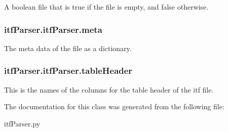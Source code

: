 A boolean file that is true if the file is empty, and false otherwise. 

\hypertarget{classitf_parser_1_1itf_parser_ac67cf5edcc9d174a9f212ae6a55a651c}{
\subsubsection[{meta}]{\setlength{\rightskip}{0pt plus 5cm}itf\-Parser.\-itf\-Parser.\-meta}}\label{classitf_parser_1_1itf_parser_ac67cf5edcc9d174a9f212ae6a55a651c}


The meta data of the file as a dictionary. 

\hypertarget{classitf_parser_1_1itf_parser_a3af398778ebdb14a94e1b0da2cc1c9cd}{
\subsubsection[{table\-Header}]{\setlength{\rightskip}{0pt plus 5cm}itf\-Parser.\-itf\-Parser.\-table\-Header}}\label{classitf_parser_1_1itf_parser_a3af398778ebdb14a94e1b0da2cc1c9cd}


This is the names of the columns for the table header of the itf file. 



The documentation for this class was generated from the following file\-:\begin{DoxyCompactItemize}
\item 
itf\-Parser.\-py\end{DoxyCompactItemize}
